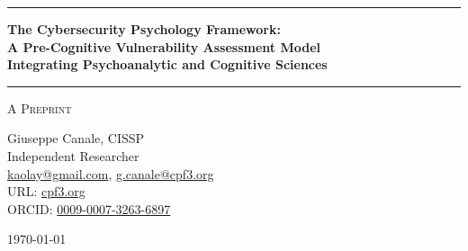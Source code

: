 \documentclass[11pt,a4paper]{article}
\begin{document}
\thispagestyle{empty}
\begin{center}

\vspace*{0.5cm}

\rule{\textwidth}{1.5pt}

\vspace{0.5cm}

{\LARGE \textbf{The Cybersecurity Psychology Framework:}}\\[0.3cm]
{\LARGE \textbf{A Pre-Cognitive Vulnerability Assessment Model}}\\[0.3cm]
{\LARGE \textbf{Integrating Psychoanalytic and Cognitive Sciences}}

\vspace{0.5cm}

\rule{\textwidth}{1.5pt}

\vspace{0.3cm}

{\large \textsc{A Preprint}}

\vspace{0.5cm}

{\Large Giuseppe Canale, CISSP}\\[0.2cm]
Independent Researcher\\[0.1cm]
\href{mailto:kaolay@gmail.com}{kaolay@gmail.com}, 
\href{mailto:g.canale@escom.it}{g.canale@cpf3.org}\\[0.1cm]
URL: \href{https://cpf3.org}{cpf3.org}\\[0.1cm]
ORCID: \href{https://orcid.org/0009-0007-3263-6897}{0009-0007-3263-6897}

\vspace{0.8cm}

{\large \today}

\vspace{1cm}

\end{center}
\end{document}
